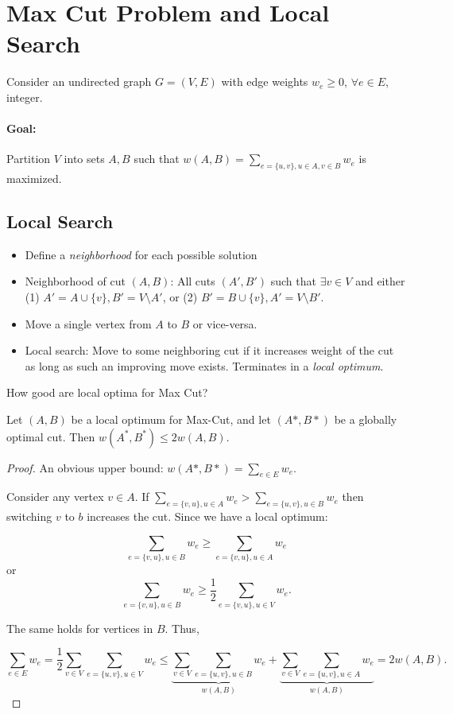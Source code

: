 \section{Max Cut Problem and Local Search}

Consider an undirected graph $G= (V,E)$ with edge weights $w_e \ge 0$, $\forall e \in E$, integer.

\paragraph{Goal:} Partition $V$ into sets $A,B$ such that $w(A,B) = \sum\limits_{e = \{u,v\}, u \in A, v \in B} w_e$ is maximized.

\subsection{Local Search}

\begin{itemize}
	\item Define a \emph{neighborhood} for each possible solution
	\item Neighborhood of cut $(A,B)$: All cuts $(A', B')$ such that $\exists v \in V$ and either (1) $A' = A \cup \{v\}, B' = V \setminus A'$, or (2) $B' = B \cup \{v\}, A' = V \setminus B'$.
	\item Move a single vertex from $A$ to $B$ or vice-versa.
	\item Local search: Move to some neighboring cut if it increases weight of the cut as long as such an improving move exists. Terminates in a \emph{local optimum}.
\end{itemize}

How good are local optima for Max Cut?

\begin{mytheorem}
Let $(A,B)$ be a local optimum for Max-Cut, and let $(A*,B*)$ be a globally	optimal cut. Then $w(A^*, B^*) \le 2w(A,B)$. 
\end{mytheorem}
\begin{proof}
	An obvious upper bound: $w(A*, B*) = \sum\limits_{e \in E} w_e$.
	
	Consider any vertex $v \in A$. If $\sum\limits_{e = \{v,u\}, u \in A} w_e > \sum\limits_{e = \{u,v\}, u \in B} w_e$ then switching $v$ to $b$ increases the cut.
	Since we have a local optimum:
	
	$$\sum\limits_{e=\{v,u\}, u\in B} w_e \ge \sum\limits_{e=\{v,u\}, u\in A} w_e$$
	or 
	$$\sum\limits_{e=\{v,u\}, u\in B} w_e \ge \frac{1}{2}\sum\limits_{e=\{v,u\}, u\in V} w_e.$$
	
	The same holds for vertices in $B$. Thus,
	
	$$\sum\limits_{e \in E} w_e = \frac{1}{2} \sum\limits_{v \in V} \sum\limits_{e = \{u,v\}, u \in V} w_e \le \underbrace{\sum\limits_{v \in V} \sum\limits_{e = \{u,v\}, u \in B} w_e}_{w(A,B)} + \underbrace{\sum\limits_{v \in V} \sum\limits_{e = \{u,v\}, u \in A} w_e}_{w(A,B)} = 2w(A,B).$$
\end{proof}

